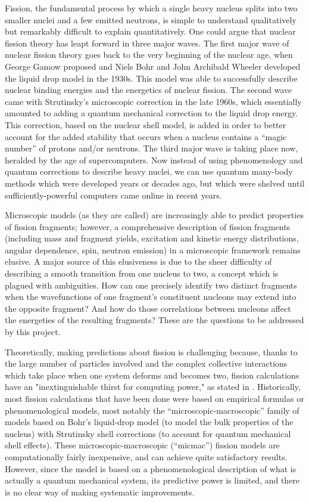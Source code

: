 Fission, the fundamental process by which a single heavy nucleus splits into two smaller nuclei and a few emitted neutrons, is simple to understand qualitatively but remarkably difficult to explain quantitatively. One could argue that nuclear fission theory has leapt forward in three major waves. The first major wave of nuclear fission theory goes back to the very beginning of the nuclear age, when George Gamow proposed and Niels Bohr and John Archibald Wheeler developed the liquid drop model in the 1930s. This model was able to successfully describe nuclear binding energies and the energetics of nuclear fission. The second wave came with Strutinsky’s microscopic correction in the late 1960s, which essentially amounted to adding a quantum mechanical correction to the liquid drop energy. This correction, based on the nuclear shell model, is added in order to better account for the added stability that occurs when a nucleus contains a ``magic number'' of protons and/or neutrons. The third major wave is taking place now, heralded by the age of supercomputers. Now instead of using phenomenology and quantum corrections to describe heavy nuclei, we can use quantum many-body methods which were developed years or decades ago, but which were shelved until sufficiently-powerful computers came online in recent years.

Microscopic models (as they are called) are increasingly able to predict properties of fission fragments; however, a comprehensive description of fission fragments (including mass and fragment yields, excitation and kinetic energy distributions, angular dependence, spin, neutron emission) in a microscopic framework remains elusive. A major source of this elusiveness is due to the sheer difficulty of describing a smooth transition from one nucleus to two, a concept which is plagued with ambiguities. How can one precisely identify two distinct fragments when the wavefunctions of one fragment’s constituent nucleons may extend into the opposite fragment? And how do those correlations between nucleons affect the energeties of the resulting fragments? These are the questions to be addressed by this project.

Theoretically, making predictions about fission is challenging because, thanks to the large number of particles involved and the complex collective interactions which take place when one system deforms and becomes two, fission calculations have an "inextinguishable thirst for computing power," as stated in \cite{Schunck2016}. Historically, most fission calculations that have been done were based on empirical formulas or phenomenological models, most notably the ``microscopic-macroscopic'' family of models based on Bohr's liquid-drop model (to model the bulk properties of the nucleus) with Strutinsky shell corrections (to account for quantum mechanical shell effects). These microscopic-macroscopic (``micmac'') fission models are computationally fairly inexpensive, and can achieve quite satisfactory results. However, since the model is based on a phenomenological description of what is actually a quantum mechanical system, its predictive power is limited, and there is no clear way of making systematic improvements.

